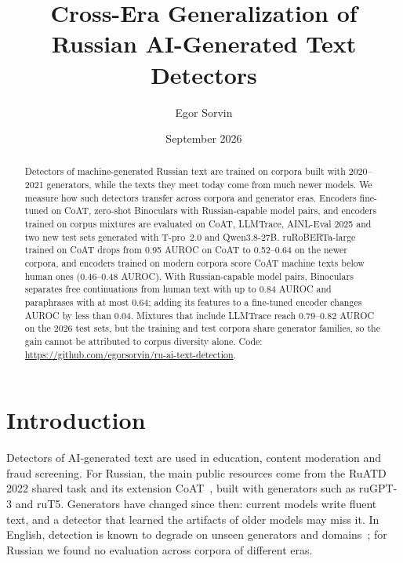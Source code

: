 \documentclass{article}
\title{Cross-Era Generalization of Russian AI-Generated Text Detectors}
\author{Egor Sorvin}
\date{September 2026}
\begin{document}
\maketitle
\begin{abstract}
Detectors of machine-generated Russian text are trained on corpora built with 2020--2021 generators, while the
texts they meet today come from much newer models. We measure how such detectors transfer across corpora and
generator eras. Encoders fine-tuned on CoAT, zero-shot Binoculars with Russian-capable model pairs, and encoders
trained on corpus mixtures are evaluated on CoAT, LLMTrace, AINL-Eval 2025 and two new test sets generated with
T-pro~2.0 and Qwen3.8-27B. ruRoBERTa-large trained on CoAT drops from 0.95 AUROC on CoAT to 0.52--0.64 on
the newer corpora, and encoders trained on modern corpora score CoAT machine texts below human ones
(0.46--0.48 AUROC). With Russian-capable model pairs, Binoculars separates free continuations from human text
with up to 0.84 AUROC and paraphrases with at most 0.64; adding its features to a fine-tuned encoder changes
AUROC by less than 0.04. Mixtures that include LLMTrace reach 0.79--0.82 AUROC on the 2026 test sets, but the
training and test corpora share generator families, so the gain cannot be attributed to corpus diversity
alone. Code:
\url{https://github.com/egorsorvin/ru-ai-text-detection}.
\end{abstract}


\section{Introduction}
Detectors of AI-generated text are used in education, content moderation and fraud screening. For Russian, the
main public resources come from the RuATD 2022 shared task and its extension CoAT~\cite{shamardina2022ruatd,
shamardina2025coat}, built with generators such as ruGPT-3 and ruT5. Generators have changed since then: current
models write fluent text, and a detector that learned the artifacts of older models may miss it. In English,
detection is known to degrade on unseen generators and domains~\cite{dugan2024raid}; for Russian we found no
evaluation across corpora of different eras.
\end{document}
